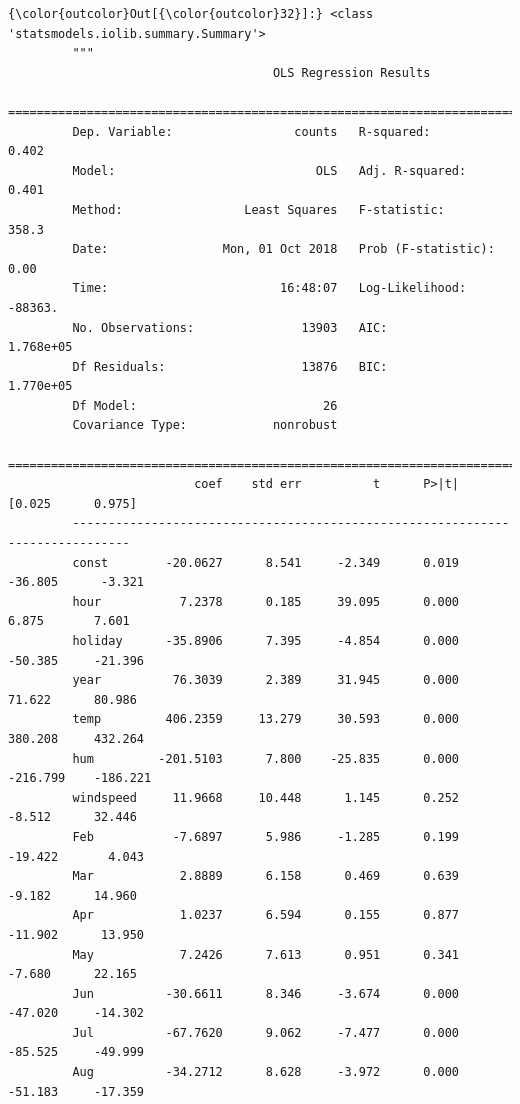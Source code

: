 \documentclass[11pt]{article}
\begin{document}
\begin{Verbatim}[commandchars=\\\{\}]
{\color{outcolor}Out[{\color{outcolor}32}]:} <class 'statsmodels.iolib.summary.Summary'>
         """
                                     OLS Regression Results                            
         ==============================================================================
         Dep. Variable:                 counts   R-squared:                       0.402
         Model:                            OLS   Adj. R-squared:                  0.401
         Method:                 Least Squares   F-statistic:                     358.3
         Date:                Mon, 01 Oct 2018   Prob (F-statistic):               0.00
         Time:                        16:48:07   Log-Likelihood:                -88363.
         No. Observations:               13903   AIC:                         1.768e+05
         Df Residuals:                   13876   BIC:                         1.770e+05
         Df Model:                          26                                         
         Covariance Type:            nonrobust                                         
         ==============================================================================
                          coef    std err          t      P>|t|      [0.025      0.975]
         ------------------------------------------------------------------------------
         const        -20.0627      8.541     -2.349      0.019     -36.805      -3.321
         hour           7.2378      0.185     39.095      0.000       6.875       7.601
         holiday      -35.8906      7.395     -4.854      0.000     -50.385     -21.396
         year          76.3039      2.389     31.945      0.000      71.622      80.986
         temp         406.2359     13.279     30.593      0.000     380.208     432.264
         hum         -201.5103      7.800    -25.835      0.000    -216.799    -186.221
         windspeed     11.9668     10.448      1.145      0.252      -8.512      32.446
         Feb           -7.6897      5.986     -1.285      0.199     -19.422       4.043
         Mar            2.8889      6.158      0.469      0.639      -9.182      14.960
         Apr            1.0237      6.594      0.155      0.877     -11.902      13.950
         May            7.2426      7.613      0.951      0.341      -7.680      22.165
         Jun          -30.6611      8.346     -3.674      0.000     -47.020     -14.302
         Jul          -67.7620      9.062     -7.477      0.000     -85.525     -49.999
         Aug          -34.2712      8.628     -3.972      0.000     -51.183     -17.359

\end{Verbatim}
\end{document}
